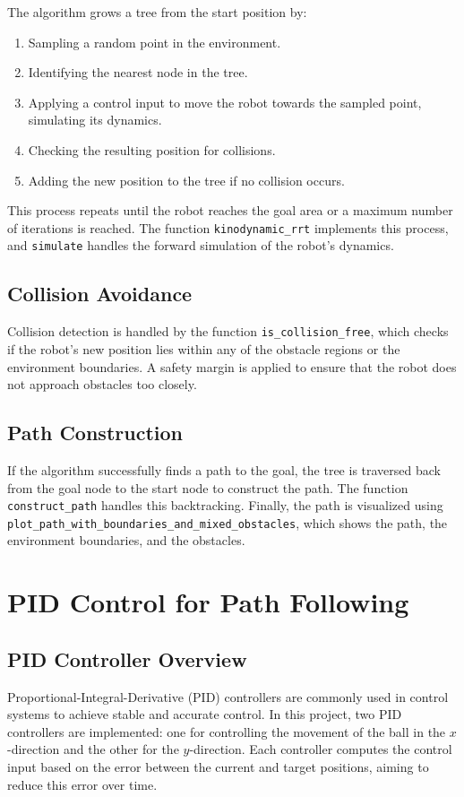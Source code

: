 \documentclass[12pt]{article}
\begin{document}
The algorithm grows a tree from the start position by:
\begin{enumerate}
    \item Sampling a random point in the environment.
    \item Identifying the nearest node in the tree.
    \item Applying a control input to move the robot towards the sampled point, simulating its dynamics.
    \item Checking the resulting position for collisions.
    \item Adding the new position to the tree if no collision occurs.
\end{enumerate}

This process repeats until the robot reaches the goal area or a maximum number of iterations is reached. The function \texttt{kinodynamic\_rrt} implements this process, and \texttt{simulate} handles the forward simulation of the robot’s dynamics.

\subsection{Collision Avoidance}
Collision detection is handled by the function \texttt{is\_collision\_free}, which checks if the robot’s new position lies within any of the obstacle regions or the environment boundaries. A safety margin is applied to ensure that the robot does not approach obstacles too closely.

\subsection{Path Construction}
If the algorithm successfully finds a path to the goal, the tree is traversed back from the goal node to the start node to construct the path. The function \texttt{construct\_path} handles this backtracking. Finally, the path is visualized using \texttt{plot\_path\_with\_boundaries\_and\_mixed\_obstacles}, which shows the path, the environment boundaries, and the obstacles.

\section{PID Control for Path Following}

\subsection{PID Controller Overview}
Proportional-Integral-Derivative (PID) controllers are commonly used in control systems to achieve stable and accurate control. In this project, two PID controllers are implemented: one for controlling the movement of the ball in the $x$-direction and the other for the $y$-direction. Each controller computes the control input based on the error between the current and target positions, aiming to reduce this error over time.
\end{document}
